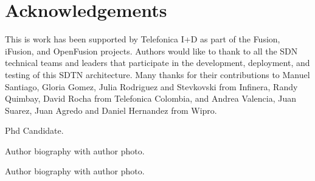 \documentclass[a4paper,fleqn]{cas-dc}
\begin{document}
\printcredits

\section*{Acknowledgements}
This is work has been supported by Telefonica I+D as part of the Fusion, iFusion, and OpenFusion projects. Authors would like to thank to all the SDN technical teams and leaders that participate in the development, deployment, and testing of this SDTN architecture. Many thanks for their contributions to Manuel Santiago, Gloria Gomez, Julia Rodriguez and  Stevkovski from Infinera, Randy Quimbay, David Rocha from Telefonica Colombia, and Andrea Valencia, Juan Suarez, Juan Agredo and Daniel Hernandez from Wipro.   

%






Phd Candidate.
\endbio

\bio{}
Author biography with author photo.
\endbio

\bio{}
Author biography with author photo.
\endbio
\end{document}
